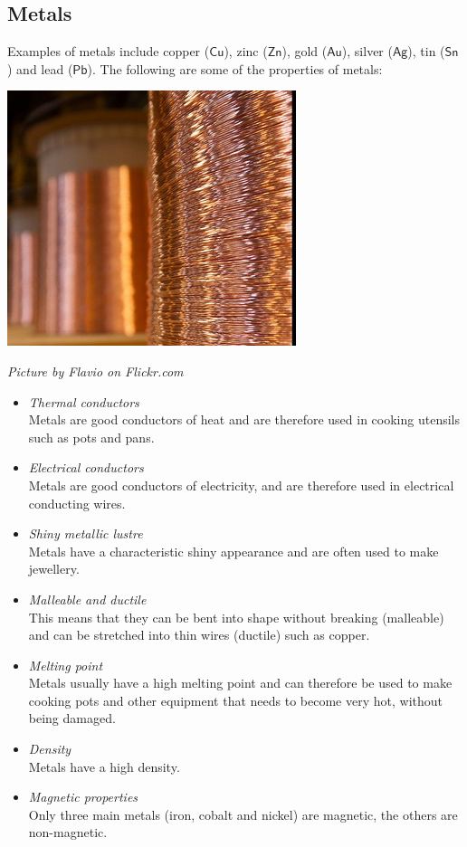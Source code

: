             \subsection*{Metals}
            \nopagebreak
\begin{minipage}{.5\textwidth}
        \label{m38708*id65726}Examples of metals include copper ($\mathsf{Cu}$), zinc ($\mathsf{Zn}$), gold ($\mathsf{Au}$), silver ($\mathsf{Ag}$), tin ($\mathsf{Sn}$) and lead ($\mathsf{Pb}$). The following are some of the properties of metals:\par 
\end{minipage}
\begin{minipage}{.5\textwidth}
\begin{center}
 \includegraphics[width=.2\textwidth]{photos/copperwireby-flavio.jpg}\par
\textit{Picture by Flavio on Flickr.com}
\end{center}
\end{minipage}
\vspace{-.5cm}
        \label{m38708*id65732}\begin{itemize}[noitemsep]
            \label{m38708*uid77}\item \textsl{Thermal conductors} \\
Metals are good conductors of heat and are therefore used in cooking utensils such as pots and pans.
\label{m38708*uid78}\item \textsl{Electrical conductors} \\
Metals are good conductors of electricity, and are therefore used in electrical conducting wires.
\label{m38708*uid79}\item \textsl{Shiny metallic lustre} \\
Metals have a characteristic shiny appearance and are often used to make jewellery.
\label{m38708*uid80}\item \textsl{Malleable and ductile} \\
This means that they can be bent into shape without breaking (malleable) and can be stretched into thin wires (ductile) such as copper.
\label{m38708*uid81}\item \textsl{Melting point} \\
Metals usually have a high melting point and can therefore be used to make cooking pots and other equipment that needs to become very hot, without being damaged.
\label{m38708*uid82}\item \textsl{Density} \\
Metals have a high density.
\item \textsl{Magnetic properties} \\ 
Only three main metals (iron, cobalt and nickel) are magnetic, the others are non-magnetic.
\end{itemize}
